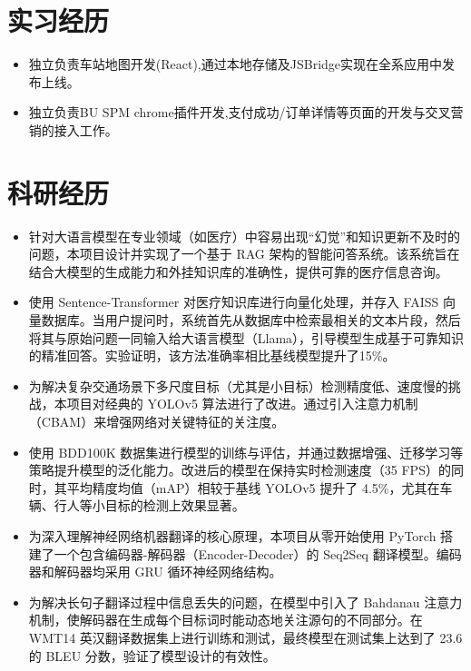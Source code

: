 \documentclass{cls/resume}
\begin{document}
\section{实习经历}
\begin{itemize}
    \item 独立负责车站地图开发(React),通过本地存储及JSBridge实现在全系应用中发布上线。
    \item 独立负责BU SPM chrome插件开发,支付成功/订单详情等页面的开发与交叉营销的接入工作。
\end{itemize}

\section{科研经历}
\begin{itemize}
  \item 针对大语言模型在专业领域（如医疗）中容易出现“幻觉”和知识更新不及时的问题，本项目设计并实现了一个基于 RAG 架构的智能问答系统。该系统旨在结合大模型的生成能力和外挂知识库的准确性，提供可靠的医疗信息咨询。
  \item 使用 Sentence-Transformer 对医疗知识库进行向量化处理，并存入 FAISS 向量数据库。当用户提问时，系统首先从数据库中检索最相关的文本片段，然后将其与原始问题一同输入给大语言模型（Llama），引导模型生成基于可靠知识的精准回答。实验证明，该方法准确率相比基线模型提升了15\%。
\end{itemize}

\begin{itemize}
  \item 为解决复杂交通场景下多尺度目标（尤其是小目标）检测精度低、速度慢的挑战，本项目对经典的 YOLOv5 算法进行了改进。通过引入注意力机制（CBAM）来增强网络对关键特征的关注度。
  \item 使用 BDD100K 数据集进行模型的训练与评估，并通过数据增强、迁移学习等策略提升模型的泛化能力。改进后的模型在保持实时检测速度（35 FPS）的同时，其平均精度均值（mAP）相较于基线 YOLOv5 提升了 4.5\%，尤其在车辆、行人等小目标的检测上效果显著。
\end{itemize}

\begin{itemize}
  \item 为深入理解神经网络机器翻译的核心原理，本项目从零开始使用 PyTorch 搭建了一个包含编码器-解码器（Encoder-Decoder）的 Seq2Seq 翻译模型。编码器和解码器均采用 GRU 循环神经网络结构。
  \item 为解决长句子翻译过程中信息丢失的问题，在模型中引入了 Bahdanau 注意力机制，使解码器在生成每个目标词时能动态地关注源句的不同部分。在 WMT14 英汉翻译数据集上进行训练和测试，最终模型在测试集上达到了 23.6 的 BLEU 分数，验证了模型设计的有效性。
\end{itemize}
\end{document}
